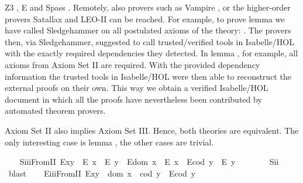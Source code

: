 \begin{isabellebody}
\begin{isamarkuptext}
 Z3 \cite{Z3}, E \cite{E} and Spass \cite{Spass}. 
 Remotely, also provers such as Vampire \cite{Vampire}, or the higher-order provers 
 Satallax \cite{Satallax} and LEO-II \cite{LEO} 
 can be reached. For example, to prove lemma  we have called Sledgehammer on all 
 postulated axioms of the theory: .  
 The provers then, via Sledgehammer, suggested to call trusted/verified tools in Isabelle/HOL
 with the exactly required dependencies they detected. In lemma , for 
 example, all  axioms from Axiom Set II are required. With the provided dependency information 
 the trusted tools in Isabelle/HOL were then able to reconstruct the external proofs on their own.
 This way we obtain a verified Isabelle/HOL document in which all the proofs have nevertheless been contributed
 by automated theorem provers.%
\end{isamarkuptext}\isamarkuptrue%
%
\begin{isamarkuptext}%
Axiom Set II also implies Axiom Set III. Hence, both theories are
 equivalent. The only interesting case is lemma , the other cases are 
 trivial.%
\end{isamarkuptext}\isamarkuptrue%
\isanewline
\ \ \isamarkupfalse%
\ S\isactrlsub i\isactrlsub i\isactrlsub iFromII{\isacharcolon}\ {\isachardoublequoteopen}{\isacharparenleft}E{\isacharparenleft}x{\isasymcdot}y{\isacharparenright}\ \isactrlbold {\isasymrightarrow}\ {\isacharparenleft}E\ x\ \isactrlbold {\isasymand}\ E\ y{\isacharparenright}{\isacharparenright}\ \isactrlbold {\isasymand}\ {\isacharparenleft}E{\isacharparenleft}dom\ x{\isacharparenright}\ \isactrlbold {\isasymrightarrow}\ E\ x{\isacharparenright}\ \isactrlbold {\isasymand}\ {\isacharparenleft}E{\isacharparenleft}cod\ y{\isacharparenright}\ \isactrlbold {\isasymrightarrow}\ E\ y{\isacharparenright}{\isachardoublequoteclose}\ \ \isanewline
%
\isadelimproof
\ \ \ \ %
\endisadelimproof
%
\isatagproof
{}\isamarkupfalse%
\ S\isactrlsub i\isactrlsub i\ \isamarkupfalse%
\ blast%
\endisatagproof
{\isafoldproof}%
%
\isadelimproof
\isanewline
%
\endisadelimproof
\ \ \isamarkupfalse%
\ E\isactrlsub i\isactrlsub i\isactrlsub iFromII{\isacharcolon}\ {\isachardoublequoteopen}E{\isacharparenleft}x{\isasymcdot}y{\isacharparenright}\ \isactrlbold {\isasymleftarrow}\ {\isacharparenleft}dom\ x\ {\isasymcong}\ cod\ y\ \isactrlbold {\isasymand}\ {\isacharparenleft}E{\isacharparenleft}cod\ y{\isacharparenright}{\isacharparenright}{\isacharparenright}{\isachardoublequoteclose}\ \isanewline

\end{isabellebody}
